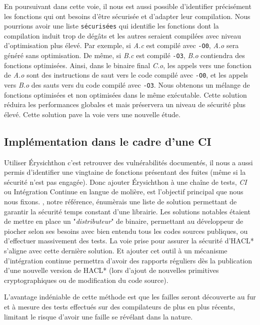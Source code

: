 En poursuivant dans cette voie, il nous est aussi possible d'identifier précisément les fonctions qui ont besoins d'être sécurisée et d'adapter leur compilation. Nous pourrions avoir une liste \texttt{sécurisées} qui identifie les fonctions dont la compilation induit trop de dégâts et les autres seraient compilées avec niveau d'optimisation plus élevé. Par exemple, si \textit{A.c} est compilé avec \texttt{-O0}, \textit{A.o} sera généré sans optimisation. De même, si \textit{B.c} est compilé \texttt{-O3}, \textit{B.o} contiendra des fonctions optimisées. Ainsi, dans le binaire final \textit{C.o}, les appels vers une fonction de \textit{A.o} sont des instructions de saut vers le code compilé avec \texttt{-O0}, et les appels vers \textit{B.o} des sauts vers du code compilé avec \texttt{-O3}. Nous obtenons un mélange de fonctions optimisées et non optimisées dans le même exécutable. Cette solution réduira les performances globales et mais préservera un niveau de sécurité plus élevé. Cette solution pave la voie vers une nouvelle étude.\medbreak

\subsection*{Implémentation dans le cadre d'une CI}

Utiliser Érysichthon c'est retrouver des vulnérabilités documentés, il nous a aussi permis d'identifier une vingtaine de fonctions présentant des fuites (même si la sécurité n'est pas engagée). Donc ajouter Érysichthon à une chaîne de tests, \textit{CI} ou Intégration Continue en langue de molière, est l'objectif principal que nous nous fixons. \citeauthor{schneider2024breakingbadcompilersbreak}, notre référence, énumèrais une liste de solution permettant de garantir la sécurité temps constant d'une librairie. Les solutions notables étaient de mettre en place un "\textit{distributeur}" de binaire, permettant au développeur de piocher selon ses besoins avec bien entendu tous les codes sources publiques, ou d'effectuer massivement des tests. La voie prise pour assurer la sécurité d'HACL* s'aligne avec cette dernière solution. Et ajouter cet outil à un mécanisme d'intégration continue permettra d'avoir des rapports réguliers dès la publication d'une nouvelle version de HACL* (lors d'ajout de nouvelles primitives cryptographiques ou de modification du code source).\smallbreak

L'avantage indéniable de cette méthode est que les failles seront découverte au fur et à mesure des tests effectués sur des compilateurs de plus en plus récents, limitant le risque d'avoir une faille se révélant dans la nature.


